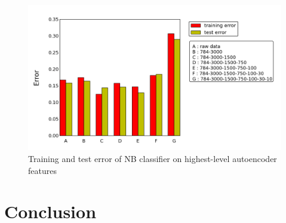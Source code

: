 \documentclass{article}
\begin{document}
\begin{figure}[htbp!]
    \centering
    \includegraphics[width=\textwidth]{trainingAndTestError.png}
    \caption{Training and test error of NB classifier on highest-level autoencoder features}
    \label{fig:error}
\end{figure}%

\section{Conclusion}\label{sec:conclusion}

\nocite{*}
{}

\end{document}
